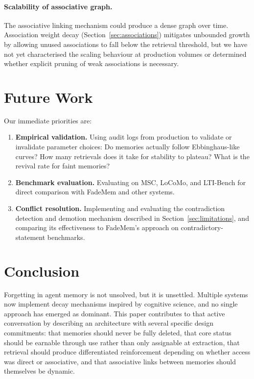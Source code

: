 \documentclass[11pt,a4paper]{article}
\begin{document}
\paragraph{Scalability of associative graph.} The associative linking mechanism could produce a dense graph over time. Association weight decay (Section~\ref{sec:associations}) mitigates unbounded growth by allowing unused associations to fall below the retrieval threshold, but we have not yet characterised the scaling behaviour at production volumes or determined whether explicit pruning of weak associations is necessary.

\section{Future Work}

Our immediate priorities are:

\begin{enumerate}
    \item \textbf{Empirical validation.} Using audit logs from production to validate or invalidate parameter choices: Do memories actually follow Ebbinghaus-like curves? How many retrievals does it take for stability to plateau? What is the revival rate for faint memories?
    \item \textbf{Benchmark evaluation.} Evaluating on MSC, LoCoMo, and LTI-Bench for direct comparison with FadeMem and other systems.
    \item \textbf{Conflict resolution.} Implementing and evaluating the contradiction detection and demotion mechanism described in Section~\ref{sec:limitations}, and comparing its effectiveness to FadeMem's approach on contradictory-statement benchmarks.
\end{enumerate}

\section{Conclusion}

Forgetting in agent memory is not unsolved, but it is unsettled. Multiple systems now implement decay mechanisms inspired by cognitive science, and no single approach has emerged as dominant. This paper contributes to that active conversation by describing an architecture with several specific design commitments: that memories should never be fully deleted, that core status should be earnable through use rather than only assignable at extraction, that retrieval should produce differentiated reinforcement depending on whether access was direct or associative, and that associative links between memories should themselves be dynamic.
\end{document}
